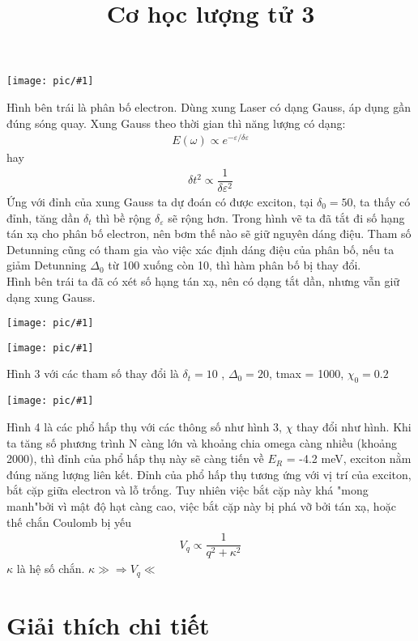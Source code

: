 \documentclass{article}
\title{\Huge{Cơ học lượng tử 3}}
\newcommand{\image}[1]{
	\begin{center}
		\texttt{[image: pic/\#1]}
	\end{center}
}
\newcommand{\f}[2]{\dfrac{#1}{#2}}
\begin{document}
\image{pic1.png}
Hình bên trái là phân bố electron. Dùng xung Laser có dạng Gauss, áp dụng gần đúng sóng quay. Xung Gauss theo thời gian thì năng lượng có dạng:
\begin{align}
	E(\omega) \propto e^{-\varepsilon / \delta \varepsilon}
\end{align}
hay
\begin{align}
	\delta t^{2} \propto \f{1}{\delta \varepsilon ^{2}}
\end{align}
Ứng với đỉnh của xung Gauss ta dự đoán có được exciton, tại $\delta_{0} = 50$, ta thấy có đỉnh, tăng dần $\delta_{t}$ thì bề rộng $\delta_{\varepsilon}$ sẽ rộng hơn. Trong hình vẽ ta đã tắt đi số hạng tán xạ cho phân bố electron, nên bơm thế nào sẽ giữ nguyên dáng điệu. Tham số Detunning cũng có tham gia vào việc xác định dáng điệu của phân bố, nếu ta giảm Detunning $\Delta_{0}$ từ 100 xuống còn 10, thì hàm phân bố bị thay đổi.\\
Hình bên trái ta đã có xét số hạng tán xạ, nên có dạng tắt dần, nhưng vẫn giữ dạng xung Gauss.
\image{pic2.png}
\image{pic3.png}
Hình 3 với các tham số thay đổi là $\delta_{t} = 10$ , $\Delta_{0} = 20$, tmax = 1000, $\chi_{0} = 0.2$
\image{pic4.png}
Hình 4 là các phổ hấp thụ với các thông số như hình 3, $\chi$ thay đổi như hình. Khi ta tăng số phương trình N càng lớn và khoảng chia omega càng nhiều
(khoảng 2000), thì đỉnh của phổ hấp thụ này sẽ càng tiến về $E_{R}$ = -4.2 meV,
exciton nằm đúng năng lượng liên kết. Đỉnh của phổ hấp thụ tương ứng với vị trí của exciton, bắt cặp giữa electron và
lỗ trống. Tuy nhiên việc bắt cặp này khá "mong manh"bởi vì mật độ hạt càng
cao, việc bắt cặp này bị phá vỡ bởi tán xạ, hoặc thế chắn Coulomb bị yếu
\begin{align}
	V_{q} \propto \f{1}{q^{2} + \kappa^{2}}
\end{align}
$\kappa$ là hệ số chắn. $\kappa \gg \Rightarrow V_{q} \ll$

\section{Giải thích chi tiết}
\end{document}
